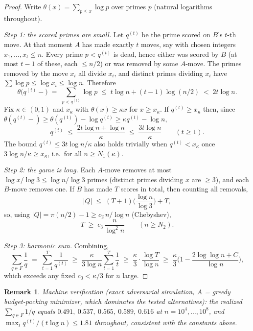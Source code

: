 \documentclass{article}
\newtheorem{remark}{Remark}
\begin{document}
\begin{proof}
Write $\theta(x) = \sum_{p \le x} \log p$ over primes $p$ (natural
logarithms throughout).

\emph{Step 1: the scored primes are small.}
Let $q^{(t)}$ be the prime scored on $B$'s $t$-th move. At that moment $A$
has made exactly $t$ moves, say with chosen integers $x_1, \dots, x_t \le n$.
Every prime $p < q^{(t)}$ is dead, hence either was scored by $B$ (at most
$t-1$ of these, each $\le n/2$) or was removed by some $A$-move. The primes
removed by the move $x_i$ all divide $x_i$, and distinct primes dividing
$x_i$ have $\sum \log p \le \log x_i \le \log n$. Therefore
\[
\theta\big(q^{(t)}{-}\big) \;=\; \sum_{p < q^{(t)}} \log p
\;\le\; t \log n + (t-1)\log (n/2) \;<\; 2t \log n .
\]
Fix $\kappa \in (0,1)$ and $x_\kappa$ with $\theta(x) \ge \kappa x$ for
$x \ge x_\kappa$. If $q^{(t)} \ge x_\kappa$ then, since
$\theta(q^{(t)}-) \ge \theta(q^{(t)}) - \log q^{(t)} \ge \kappa q^{(t)} - \log n$,
\[
q^{(t)} \;\le\; \frac{2t \log n + \log n}{\kappa} \;\le\; \frac{3t \log n}{\kappa}
\qquad (t \ge 1).
\]
The bound $q^{(t)} \le 3t\log n/\kappa$ also holds trivially when
$q^{(t)} < x_\kappa$ once $3\log n/\kappa \ge x_\kappa$, i.e.\ for all
$n \ge N_1(\kappa)$.

\emph{Step 2: the game is long.}
Each $A$-move removes at most $\log x/\log 3 \le \log n/\log 3$ primes
(distinct primes dividing $x$ are $\ge 3$), and each $B$-move removes one.
If $B$ has made $T$ scores in total, then counting all removals,
\[
|Q| \;\le\; (T+1)\Big(\frac{\log n}{\log 3}\Big) + T ,
\]
so, using $|Q| = \pi(n/2) - 1 \ge c_2\, n/\log n$ (Chebyshev),
\[
T \;\ge\; c_3\, \frac{n}{\log^2 n} \qquad (n \ge N_2).
\]

\emph{Step 3: harmonic sum.}
Combining,
\[
\sum_{q \in F} \frac1q \;=\; \sum_{t=1}^{T} \frac{1}{q^{(t)}}
\;\ge\; \frac{\kappa}{3\log n} \sum_{t=1}^{T}\frac1t
\;\ge\; \frac{\kappa}{3}\cdot\frac{\log T}{\log n}
\;\ge\; \frac{\kappa}{3}\Big(1 - \frac{2\log\log n + C}{\log n}\Big),
\]
which exceeds any fixed $c_0 < \kappa/3$ for $n$ large. \qedhere
\end{proof}

\begin{remark}
Machine verification (exact adversarial simulation, $A$ = greedy
budget-packing minimizer, which dominates the tested alternatives): the
realized $\sum_{q \in F} 1/q$ equals $0.491,\ 0.537,\ 0.565,\ 0.589,\
0.616$ at $n = 10^4, \dots, 10^8$, and $\max_t q^{(t)}/(t\log n) \le 1.81$
throughout, consistent with the constants above.
\end{remark}
\end{document}

